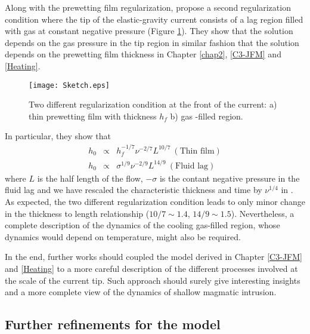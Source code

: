 Along      with      the     prewetting      film      regularization,
\citet{Anonymous:QWXp_4JV} propose  a second  regularization condition
where the tip of the elastic-gravity  current consists of a lag region
filled   with    gas   at    constant   negative    pressure   (Figure
\ref{C7-Sketch}).   They show  that the  solution depends  on the  gas
pressure  in the  tip  region  in similar  fashion  that the  solution
depends  on  the prewetting  film  thickness  in Chapter  \ref{chap2},
\ref{C3-JFM} and \ref{Heating}.
\begin{figure}[h!]
  \begin{center}
    \graphicspath{ {/Users/thorey/Documents/These/Manuscript/Figure/Chapter7/} }
    \texttt{[image: Sketch.eps]}
    \caption{Two different  regularization condition  at the  front of
      the current: a) thin prewetting film with thickness $h_f$ b) gas
      -filled region.}
    \label{C7-Sketch}
  \end{center}
\end{figure}
In particular, they show that
\begin{eqnarray}
  h_0&\propto& h_f^{-1/7}\nu^{-2/7}L^{10/7}~(\text{Thin film})\\
  h_0&\propto& \sigma^{1/9}\nu^{-2/9}L^{14/9}~(\text{Fluid lag})
\end{eqnarray}
where $L$  is the half  length of the  flow, $-\sigma$ is  the contant
negative  pressure  in  the  fluid   lag  and  we  have  rescaled  the
characteristic    thickness    and     time    by    $\nu^{1/4}$    in
\citet{Anonymous:QWXp_4JV}.    As   expected,    the   two   different
regularization condition leads  to only minor change  in the thickness
to   length   relationship   ($10/7\sim  1.4$,   $14/9\sim   1.5   $).
Nevertheless, a  complete description of  the dynamics of  the cooling
gas-filled region,  whose dynamics would depend  on temperature, might
also be required.

In the end, further works should  coupled the model derived in Chapter
\ref{C3-JFM} and  \ref{Heating} to a  more careful description  of the
different processes  involved at  the scale of  the current  tip. Such
approach should surely  give interesting insights and  a more complete
view of the dynamics of shallow magmatic intrusion.

\subsection{Further refinements for the model}

